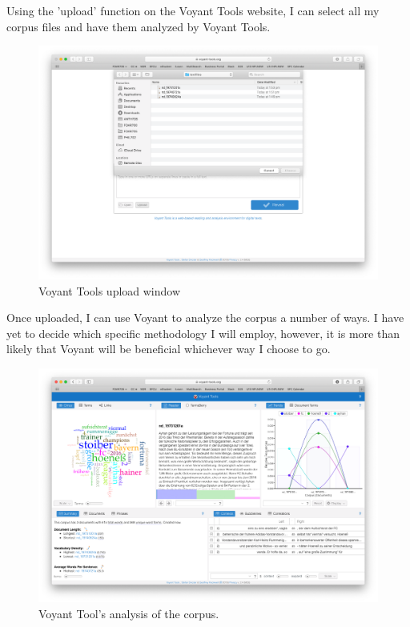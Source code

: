 \documentclass{article}
\begin{document}
Using the 'upload' function on the Voyant Tools website, I can select all my corpus files and have them analyzed by Voyant Tools.

\begin{figure}[h!]
    \centering
    \includegraphics[scale=0.15]{voyantupload.png}
    \caption{Voyant Tools upload window}
    \label{fig:my_label}
\end{figure}

Once uploaded, I can use Voyant to analyze the corpus a number of ways. I have yet to decide which specific methodology I will employ, however, it is more than likely that Voyant will be beneficial whichever way I choose to go.

\begin{figure}[h!]
    \centering
    \includegraphics[width=\textwidth]{voyantresult.png}
    \caption{Voyant Tool's analysis of the corpus.}
    \label{fig:my_label}
\end{figure}
\end{document}
